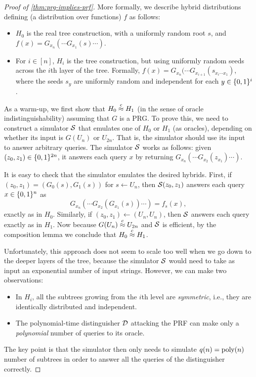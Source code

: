 \documentclass[11pt]{article}
\begin{document}
\begin{proof}[Proof of \cref{thm:prg-implies-prf}]
  More formally, we describe hybrid distributions defining (a
  distribution over functions) $f$ as follows:
  \begin{itemize}
  \item $H_{0}$ is the real tree construction, with a uniformly random
    root $s$, and $f(x) = G_{x_{n}}(\cdots G_{x_{1}}(s) \cdots)$.
  \item For $i \in [n]$, $H_{i}$ is the tree construction, but using
    uniformly random seeds across the $i$th layer of the tree.
    Formally, $f(x) = G_{x_{n}}(\cdots G_{x_{i+1}}(s_{x_{i}\cdots
      x_{1}})$, where the seeds $s_{y}$ are uniformly random and
    independent for each $y \in \{0,1\}^{i}$.
  \end{itemize}
  
  As a warm-up, we first show that $H_{0} \stackrel{c}{\approx} H_{1}$ (in the
  sense of oracle indistinguishability) assuming that $G$ is a PRG.
  To prove this, we need to construct a simulator $\mathcal{S}$ that emulates
  one of $H_{0}$ or $H_{1}$ (as oracles), depending on whether its
  input is $G(U_{n})$ or $U_{2n}$.  That is, the simulator should use
  its input to answer arbitrary queries.  The simulator $\mathcal{S}$ works
  as follows: given $(z_{0}, z_{1}) \in \{0,1\}^{2n}$, it answers each
  query $x$ by returning $G_{x_{n}}(\cdots G_{x_{2}}(z_{x_{1}})\cdots
  )$.

  It is easy to check that the simulator emulates the desired hybrids.
  First, if $(z_{0}, z_{1}) = (G_{0}(s), G_{1}(s))$ for $s \gets
  U_{n}$, then $\mathcal{S}(z_{0}, z_{1})$ answers each query $x \in
  \{0,1\}^{n}$ as
  \[ G_{x_{n}}(\cdots G_{x_{2}}(G_{x_{1}}(s)) \cdots ) = f_{s}(x), \]
  exactly as in $H_{0}$.  Similarly, if $(z_0, z_1) \gets (U_n,
  U_n)$, then $\mathcal{S}$ answers each query exactly as in $H_{1}$.  Now
  because $G(U_{n}) \stackrel{c}{\approx} U_{2n}$ and $\mathcal{S}$ is efficient, by the
  composition lemma we conclude that $H_0 \stackrel{c}{\approx} H_1$.

  Unfortunately, this approach does not seem to scale too well when we
  go down to the deeper layers of the tree, because the simulator
  $\mathcal{S}$ would need to take as input an exponential number of input
  strings.  However, we can make two observations:
  \begin{itemize}
  \item In $H_{i}$, all the subtrees growing from the $i$th level are
    \emph{symmetric}, i.e., they are identically distributed and
    independent.
  \item The polynomial-time distinguisher $\mathcal{D}$ attacking the PRF
    can make only a \emph{polynomial} number of queries to its oracle.
  \end{itemize}
  The key point is that the simulator then only needs to simulate
  $q(n) = \operatorname{poly}(n)$ number of subtrees in order to answer all the
  queries of the distinguisher correctly.


\end{proof}
\end{document}
